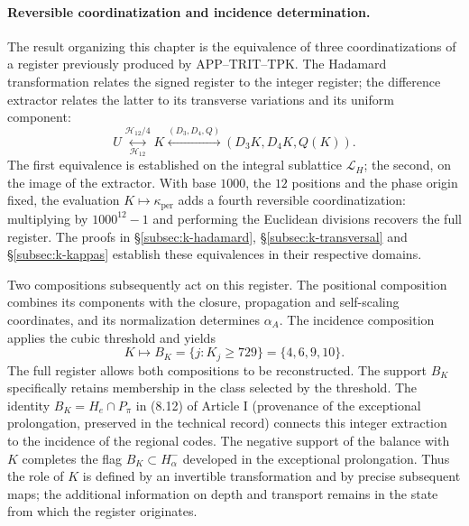 \paragraph{Reversible coordinatization and incidence determination.}
\label{ampl-alfa-k-intro-reversible}
The result organizing this chapter is the equivalence of three
coordinatizations of a register previously produced by
APP--TRIT--TPK. The Hadamard transformation relates the signed register
to the integer register; the difference extractor relates
the latter to its transverse variations and its uniform component:
\[
 U\underset{\mathcal H_{12}}{\overset{\mathcal H_{12}/4}{\longleftrightarrow}}K
 \overset{(D_3,D_4,Q)}{\longleftrightarrow}
 (D_3K,D_4K,Q(K)).
\]
The first equivalence is established on the integral sublattice
$\mathcal L_H$; the second, on the image of the extractor. With
base $1000$, the $12$ positions and the phase origin fixed, the evaluation
$K\mapsto\kappa_{\mathrm{per}}$ adds a fourth reversible
coordinatization: multiplying by $1000^{12}-1$ and performing the
Euclidean divisions recovers the full register. The proofs in
\S\ref{subsec:k-hadamard}, \S\ref{subsec:k-transversal} and
\S\ref{subsec:k-kappas} establish these equivalences in their respective
domains.

Two compositions subsequently act on this register. The positional
composition combines its components with the closure,
propagation and self-scaling coordinates, and its normalization determines $\alpha_A$. The
incidence composition applies the cubic threshold and yields
\[
 K\longmapsto B_K=\{j:K_j\geq729\}=\{4,6,9,10\}.
\]
The full register allows both compositions to be reconstructed. The support
$B_K$ specifically retains membership in the class selected
by the threshold. The identity $B_K=H_e\cap P_\pi$ in
(8.12) of Article I (provenance of the exceptional prolongation, preserved in the technical record) connects this integer extraction to the incidence
of the regional codes. The negative support of the balance with $K$
completes the flag $B_K\subset H^-_\alpha$ developed in the
exceptional prolongation. Thus the role of $K$ is defined by
an invertible transformation and by precise subsequent
maps; the additional information on depth and transport remains
in the state from which the register originates.
